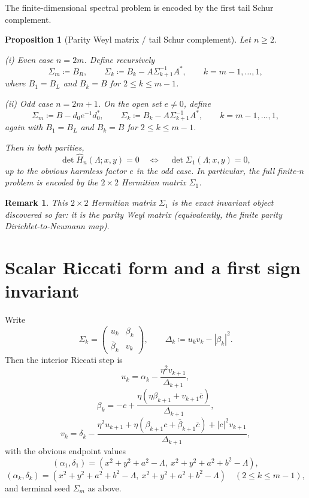 \documentclass[11pt]{article}
\newtheorem{proposition}[theorem]{Proposition}
\newtheorem{remark}[theorem]{Remark}
\begin{document}
The finite-dimensional spectral problem is encoded by the first tail Schur complement.

\begin{proposition}[Parity Weyl matrix / tail Schur complement]\label{prop:schur}
Let \(n\ge 2\).

\smallskip
\noindent
\textup{(i) Even case \(n=2m\).} Define recursively
\[
\Sigma_m\coloneqq B_R,
\qquad
\Sigma_k\coloneqq B_k-A\Sigma_{k+1}^{-1}A^*,
\qquad
k=m-1,\dots,1,
\]
where \(B_1=B_L\) and \(B_k=B\) for \(2\le k\le m-1\).

\smallskip
\noindent
\textup{(ii) Odd case \(n=2m+1\).} On the open set \(e\neq 0\), define
\[
\Sigma_m\coloneqq B-d_0e^{-1}d_0^*,
\qquad
\Sigma_k\coloneqq B_k-A\Sigma_{k+1}^{-1}A^*,
\qquad
k=m-1,\dots,1,
\]
again with \(B_1=B_L\) and \(B_k=B\) for \(2\le k\le m-1\).

\smallskip
Then in both parities,
\[
\det \widehat H_n(\Lambda;x,y)=0
\quad\Longleftrightarrow\quad
\det \Sigma_1(\Lambda;x,y)=0,
\]
up to the obvious harmless factor \(e\) in the odd case. In particular, the full
finite-\(n\) problem is encoded by the \(2\times2\) Hermitian matrix \(\Sigma_1\).
\end{proposition}

\begin{remark}
This \(2\times2\) Hermitian matrix \(\Sigma_1\) is the exact invariant object discovered so far:
it is the parity Weyl matrix (equivalently, the finite parity Dirichlet-to-Neumann map).
\end{remark}

\section{Scalar Riccati form and a first sign invariant}

Write
\[
\Sigma_k=
\begin{pmatrix}
u_k & \beta_k\\
\bar\beta_k & v_k
\end{pmatrix},
\qquad
\Delta_k\coloneqq u_kv_k-|\beta_k|^2.
\]
Then the interior Riccati step is
\[
u_k=\alpha_k-\frac{\eta^2v_{k+1}}{\Delta_{k+1}},
\]
\[
\beta_k=-c+\frac{\eta(\eta\beta_{k+1}+v_{k+1}\bar c)}{\Delta_{k+1}},
\]
\[
v_k=\delta_k-\frac{
\eta^2u_{k+1}
+\eta(\beta_{k+1}c+\bar\beta_{k+1}\bar c)
+|c|^2v_{k+1}
}{\Delta_{k+1}},
\]
with the obvious endpoint values
\[
(\alpha_1,\delta_1)=
(x^2+y^2+a^2-\Lambda,\ x^2+y^2+a^2+b^2-\Lambda),
\]
\[
(\alpha_k,\delta_k)=
(x^2+y^2+a^2+b^2-\Lambda,\ x^2+y^2+a^2+b^2-\Lambda)
\quad (2\le k\le m-1),
\]
and terminal seed \(\Sigma_m\) as above.
\end{document}
